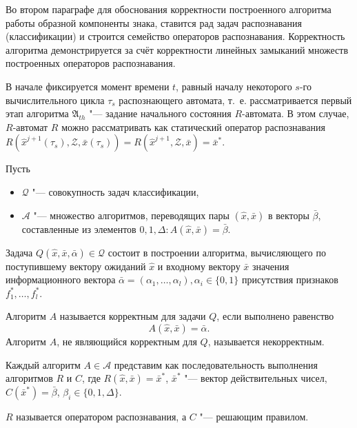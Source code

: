 Во втором параграфе для обоснования корректности построенного алгоритма работы образной компоненты знака, ставится рад задач распознавания (классификации) и строится семейство операторов распознавания. Корректность алгоритма демонстрируется за счёт корректности линейных замыканий множеств построенных операторов распознавания.

В начале фиксируется момент времени $t$, равный началу некоторого $s$-го вычислительного цикла $\tau_s$ распознающего автомата, т.~е. рассматривается первый этап алгоритма $\mathfrak A_{th}$ "--- задание начального состояния $R$-автомата. В этом случае, $R$-автомат $R$ можно рассматривать как статический оператор распознавания $R(\hat x^{j+1}(\tau_s),\mathcal Z,\bar x(\tau_s))=R(\hat x^{j+1},\mathcal Z,\bar x)=\bar x^*$.

Пусть
\begin{itemize}
	\item $\mathcal Q$ "--- совокупность задач классификации,
	\item $\mathcal A$ "--- множество алгоритмов, переводящих пары $(\hat{x},\bar{x})$ в векторы $\bar{\beta}$, составленные из элементов $0,1,\Delta:A(\hat{x},\bar{x})=\bar{\beta}$.
\end{itemize}
Задача $Q(\hat{x},\bar{x},\bar\alpha)\in\mathcal Q$ состоит в построении алгоритма, вычисляющего по поступившему вектору ожиданий $\hat{x}$ и входному вектору $\bar{x}$ значения информационного вектора $\bar\alpha=(\alpha_1,\dots,\alpha_l), \alpha_i\in\{0,1\}$ присутствия признаков $f_1^*,…,f_l^*$.

\begin{Def}
	Алгоритм $A$ называется корректным для задачи $Q$, если выполнено равенство
	$$
	A(\hat{x},\bar{x})=\bar{\alpha}.
	$$
	Алгоритм $A$, не являющийся корректным для $Q$, называется некорректным.
\end{Def}

\begin{Pred}\label{st:decompositon}
	Каждый алгоритм $A\in\mathcal A$ представим как последовательность выполнения алгоритмов $R$ и $C$, где $R(\hat{x},\bar{x})=\bar{x}^*$, $\bar{x}^*$ "--- вектор действительных чисел, $C(\bar{x}^*)=\bar{\beta}$, $\beta_i\in\{0,1,\Delta\}$.
\end{Pred}
$R$ называется оператором распознавания, а $C$ "--- решающим правилом.

